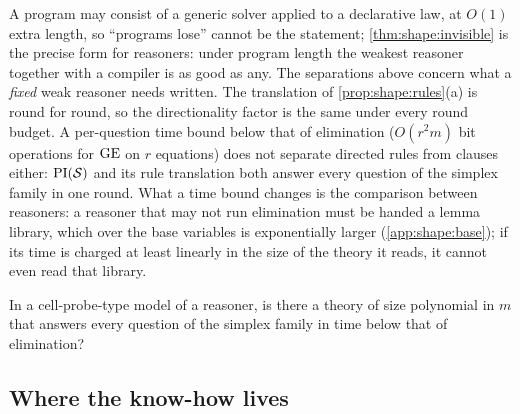 \begin{remark}\label{rem:shape:cellprobe}
A program may consist of a generic solver applied to a declarative law, at $O(1)$ extra length, so ``programs lose'' cannot be the statement; \cref{thm:shape:invisible} is the precise form for reasoners: under program length the weakest reasoner together with a compiler is as good as any. The separations above concern what a \emph{fixed} weak reasoner needs written. The translation of \cref{prop:shape:rules}(a) is round for round, so the directionality factor is the same under every round budget. A per-question time bound below that of elimination ($O(r^2m)$ bit operations for $\mathrm{GE}$ on $r$ equations) does not separate directed rules from clauses either: $\mathrm{PI}(\mathcal S)$ and its rule translation both answer every question of the simplex family in one round. What a time bound changes is the comparison between reasoners: a reasoner that may not run elimination must be handed a lemma library, which over the base variables is exponentially larger (\cref{app:shape:base}); if its time is charged at least linearly in the size of the theory it reads, it cannot even read that library.
\end{remark}

\begin{question}\label{q:shape:cellprobe}
In a cell-probe-type model of a reasoner, is there a theory of size polynomial in $m$ that answers every question of the simplex family in time below that of elimination?
\end{question}

\subsection{Where the know-how lives}\label{app:shape:homes}


